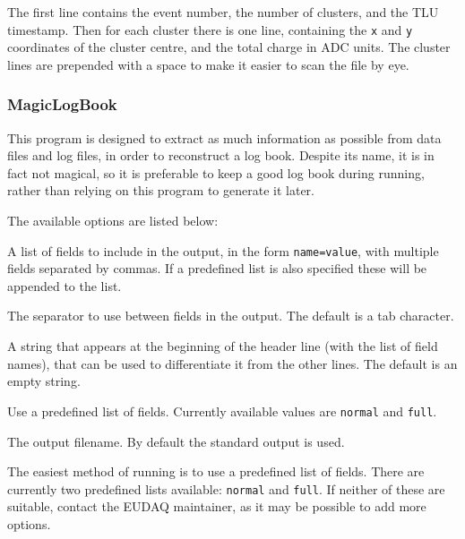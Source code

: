 The first line contains the event number,
the number of clusters, and the TLU timestamp.
Then for each cluster there is one line,
containing the \texttt{x} and \texttt{y} coordinates of the cluster centre,
and the total charge in ADC units.
The cluster lines are prepended with a space to make it easier to scan the file by eye.


\subsubsection{MagicLogBook}
This program is designed to extract as much information as possible from data files and log files,
in order to reconstruct a log book.
Despite its name, it is in fact not magical,
so it is preferable to keep a good log book during running,
rather than relying on this program to generate it later.

The available options are listed below:
\begin{description}
A list of fields to include in the output, in the form \texttt{name=value},
with multiple fields separated by commas.
If a predefined list is also specified these will be appended to the list.

The separator to use between fields in the output. The default is a tab character.

A string that appears at the beginning of the header line (with the list of field names),
that can be used to differentiate it from the other lines. The default is an empty string.

Use a predefined list of fields.
Currently available values are \texttt{normal} and \texttt{full}.

The output filename. By default the standard output is used.

\end{description}

The easiest method of running is to use a predefined list of fields.
There are currently two predefined lists available: \texttt{normal} and \texttt{full}.
If neither of these are suitable, contact the EUDAQ maintainer,
as it may be possible to add more options.

